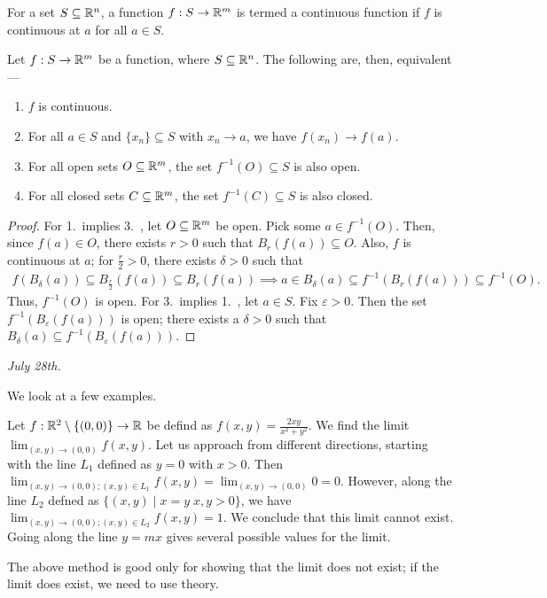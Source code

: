 \begin{definition}
    For a set $S \subseteq \mathbb{R}^{n}$, a function $f:S \to \mathbb{R}^{m}$ is termed a continuous function if $f$ is continuous at $a$ for all $a \in S$.
\end{definition}

\begin{theorem}
    Let $f:S \to \mathbb{R}^{m}$ be a function, where $S \subseteq \mathbb{R}^{n}$. The following are, then, equivalent---
    \begin{enumerate}
        \item $f$ is continuous.
        \item For all $a \in S$ and $\{x_{n}\} \subseteq S$ with $x_{n} \to a$, we have $f(x_{n}) \to f(a)$.
        \item For all open sets $O \subseteq \mathbb{R}^{m}$, the set $f^{-1}(O) \subseteq S$ is also open.
        \item For all closed sets $C \subseteq \mathbb{R}^{m}$, the set $f^{-1}(C) \subseteq S$ is also closed.
    \end{enumerate}
\end{theorem}
\begin{proof}
    For 1.~implies 3.~, let $O \subseteq \mathbb{R}^{m}$ be open. Pick some $a \in f^{-1}(O)$. Then, since $f(a) \in O$, there exists $r > 0$ such that $B_{r}(f(a)) \subseteq O$. Also, $f$ is continuous at $a$; for $\frac{r}{2} > 0$, there exists $\delta > 0$ such that 
    \begin{align}
        f(B_{\delta}(a)) \subseteq B_{\frac{r}{2}}(f(a)) \subseteq B_{r}(f(a)) \implies a \in B_{\delta}(a) \subseteq f^{-1}(B_{r}(f(a))) \subseteq f^{-1}(O).
    \end{align}
    Thus, $f^{-1}(O)$ is open. For 3.~implies 1.~, let $a \in S$. Fix $\varepsilon > 0$. Then the set $f^{-1}(B_{\varepsilon}(f(a)))$ is open; there exists a $\delta > 0$ such that $B_{\delta}(a) \subseteq f^{-1}(B_{\varepsilon}(f(a)))$.
\end{proof}
\noindent\textit{July 28th.}

We look at a few examples.
\begin{example}
    Let $f:\mathbb{R}^{2}\setminus\{(0,0)\} \to \mathbb{R}$ be defind as $f(x,y) = \frac{2xy}{x^{2}+y^{2}}$. We find the limit $\lim_{(x,y) \to (0,0)} f(x,y)$. Let us approach from different directions, starting with the line $L_{1}$ defined as $y = 0$ with $x > 0$. Then $\lim_{(x,y) \to (0,0);(x,y) \in L_{1}} f(x,y) = \lim_{(x,y) \to (0,0)} 0 = 0$. However, along the line $L_{2}$ defned as $\{(x,y) \mid x = y\; x,y > 0\}$, we have $\lim_{(x,y) \to (0,0);(x,y) \in L_{2}} f(x,y) = 1$. We conclude that this limit cannot exist. Going along the line $y = mx$ gives several possible values for the limit.
\end{example}
The above method is good only for showing that the limit does not exist; if the limit does exist, we need to use theory.

